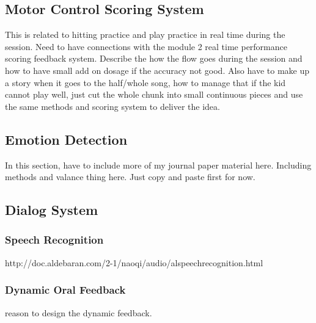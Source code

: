 \subsection{Motor Control Scoring System}
This is related to hitting practice and play practice in real time during the session.
Need to have connections with the module 2 real time performance scoring feedback system.
Describe the how the flow goes during the session and how to have small add on dosage
if the accuracy not good. 
Also have to make up a story when it goes to the half/whole song, how to manage that
if the kid cannot play well, just cut the whole chunk into small continuous pieces
and use the same methods and scoring system to deliver the idea.

\subsection{Emotion Detection}
In this section, have to include more of my journal paper material here. Including 
methods and valance thing here. Just copy and paste first for now. 


\subsection{Dialog System}

\subsubsection{Speech Recognition}
http://doc.aldebaran.com/2-1/naoqi/audio/alspeechrecognition.html

\subsubsection{Dynamic Oral Feedback}
reason to design the dynamic feedback. 

\